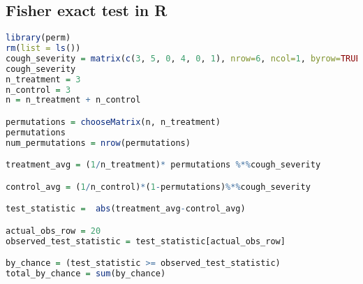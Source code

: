 \subsection {Fisher exact test in R}
\begin{lstlisting}[language=R]
library(perm)
rm(list = ls())
cough_severity = matrix(c(3, 5, 0, 4, 0, 1), nrow=6, ncol=1, byrow=TRUE)
cough_severity
n_treatment = 3
n_control = 3
n = n_treatment + n_control

permutations = chooseMatrix(n, n_treatment)
permutations
num_permutations = nrow(permutations)

treatment_avg = (1/n_treatment)* permutations %*%cough_severity

control_avg = (1/n_control)*(1-permutations)%*%cough_severity

test_statistic =  abs(treatment_avg-control_avg)

actual_obs_row = 20
observed_test_statistic = test_statistic[actual_obs_row]

by_chance = (test_statistic >= observed_test_statistic)
total_by_chance = sum(by_chance)
\end{lstlisting}
